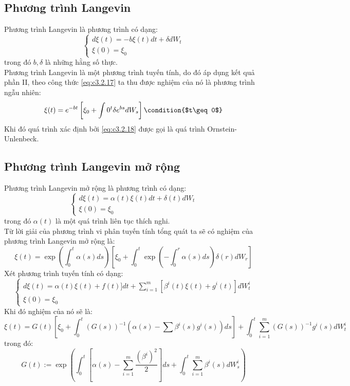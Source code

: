\documentclass[14pt,a4paper]{article}
\numberwithin{equation}{section}
\begin{document}
\subsection{Phương trình Langevin}
Phương trình Langevin là phương trình có dạng:
\begin{equation}\label{eq:c3.2.17}
	\begin{cases}
		d\xi(t)=-b\xi(t)dt+\delta dW_t\\
		\xi(0)=\xi_0
	\end{cases}
\end{equation}
trong đó $b,\delta$ là những hằng số thực.\\
Phương trình Langevin là một phương trình tuyến tính, do đó áp dụng kết quả phần II, theo công thức \eqref{eq:c3.2.17} ta thu được nghiệm của nó là phương trình ngẫu nhiên:
\begin{equation}\label{eq:c3.2.18}
	\xi(t)=e^{-bt}\left[\xi_0+\int{0}^{t}\delta e^{bs}dW_s \right] \condition{$t\geq 0$}
\end{equation}
Khi đó quá trình xác định bởi \eqref{eq:c3.2.18} được gọi là quá trình Ornstein-Unlenbeck.\\
\subsection{Phương trình Langevin mở rộng}
Phương trình Langevin mở rộng là phương trình có dạng:
\begin{equation}\label{eq:c3.2.19}
	\begin{cases}
		d\xi(t)=\alpha(t)\xi(t)dt+\delta(t)dW_t\\
		\xi(0)=\xi_0
	\end{cases}
\end{equation}
trong đó $\alpha(t)$ là một quá trình liên tục thích nghi.\\
Từ lời giải của phương trình vi phân tuyến tính tổng quát ta sẽ có nghiệm của phương trình Langevin mở rộng là:
\begin{equation}\label{eq:c3.2.20}
	\xi(t)=\exp\left(\int_{0}^{t}\alpha(s)ds\right)\left[\xi_0+\int_{0}^{t}\exp\left(-\int_{0}^{r}\alpha(s)ds \right)\delta(r)dW_r \right]
\end{equation}
Xét phương trình tuyến tính có dạng:
\begin{equation}\label{eq:c3.2.21}
	\begin{cases}
		d\xi(t)=\alpha(t)\xi(t)+f(t)]dt+\sum\limits_{i=1}^{m}\left[\beta^i(t)\xi(t)+g^i(t)\right]dW_t^i\\
		\xi(0)=\xi_0
	\end{cases}
\end{equation}
Khi đó nghiệm của nó sẽ là:
\begin{dmath}\label{eq:c3.2.22}
\xi(t)=G(t)\left[\xi_0+\int_{0}^{t}\left(G(s)\right)^{-1}\left(\alpha(s)-\sum\beta^i(s)g^i(s)\right)ds \right]+\int_{0}^{t}\sum\limits_{i=1}^{m}(G(s))^{-1}g^i(s)dW_t^i	
\end{dmath}
trong đó:
\begin{equation*}
	G(t):=\exp\left(\int_{0}^{t}\left[\alpha(s)-\sum_{i=1}^{m}\dfrac{(\beta^i)^2}{2} \right]ds+\int_{0}^{t}\sum_{i=1}^{m}\beta^i(s)dW_s^i \right)
\end{equation*}
\pagebreak
\end{document}

